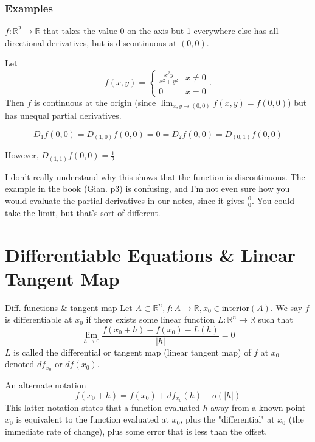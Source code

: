 \documentclass[12pt]{article}
\newcommand{\R}{\mathbb{R}}
\theoremstyle{definition}
\theoremstyle{remark}
\newenvironment{question}[2][QUESTION]{\begin{trivlist}
\item[\hskip \labelsep {\bfseries #1}\hskip \labelsep {\bfseries #2.}]}{\end{trivlist}}
\begin{document}
\subsubsection{Examples}
\begin{enumerate}
    \item $f:\R^2\to\R$ that takes the value $0$ on the axis but 1 everywhere else has all directional derivatives, but is discontinuous at $(0,0)$.
    \item Let \[ f(x,y)= \begin{cases} 
      \frac{x^2y}{x^2+y^2} & x\not = 0\\
      0 & x=0 
   \end{cases}.
\] Then $f$ is continuous at the origin (since $\lim_{x,y\to(0,0)}f(x,y)=f(0,0)$) but has unequal partial derivatives.

$$D_1f(0,0)=D_{(1,0)}f(0,0)=0=D_2f(0,0)=D_{(0,1)}f(0,0)$$

However, $D_{(1,1)}f(0,0)=\frac{1}{2}$
\begin{question}{1}
I don't really understand why this shows that the function is discontinuous. The example in the book (Gian. p3) is confusing, and I'm not even sure how you would evaluate the partial derivatives in our notes, since it gives $\frac{0}{0}$. You could take the limit, but that's sort of different.
\vspace{2in}
\end{question}
\end{enumerate}

\section{Differentiable Equations \& Linear Tangent Map}
{Diff. functions \& tangent map}
Let $A \subset \R^n, f:A\to\R, x_0\in\text{interior}(A)$. We say $f$ is differentiable at $x_0$ if there exists some linear function $L:\R^n\to\R$ such that 
\begin{equation}
    \lim_{h\to0}\frac{f(x_0+h)-f(x_0)-L(h)}{|h|}=0
\end{equation}
$L$ is called the differential or tangent map (linear tangent map) of $f$ at $x_0$ denoted $df_{x_0}$ or $df(x_0)$.

An alternate notation
\begin{equation}
    f(x_0+h)=f(x_0)+df_{x_0}(h)+o(|h|)
\end{equation}
This latter notation states that a function evaluated $h$ away from a known point $x_0$ is equivalent to the function evaluated at $x_0$, plus the "differential" at $x_0$ (the immediate rate of change), plus some error that is less than the offset.
\end{document}
